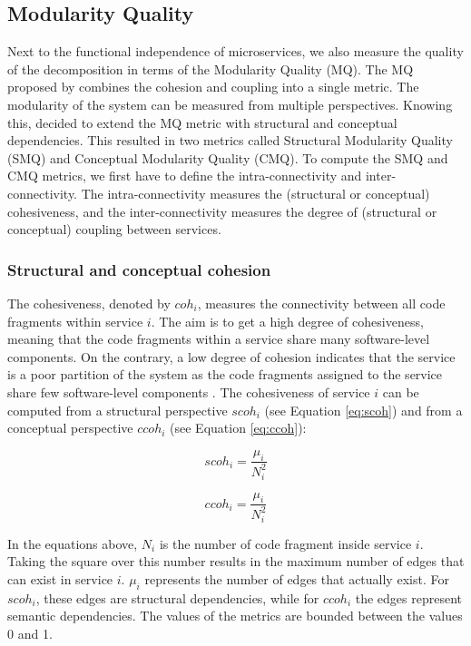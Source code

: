 \subsection{Modularity Quality}\label{ss:step4_mq}
Next to the functional independence of microservices, we also measure the quality of the decomposition in terms of the Modularity Quality (MQ). The MQ proposed by \citeauthor{mancoridis1998using} \cite{mancoridis1998using} combines the cohesion and coupling into a single metric. The modularity of the system can be measured from multiple perspectives. Knowing this, \citeauthor{jin2019service} \cite{jin2019service} decided to extend the MQ metric with structural and conceptual dependencies. This resulted in two metrics called Structural Modularity Quality (SMQ) and Conceptual Modularity Quality (CMQ). To compute the SMQ and CMQ metrics, we first have to define the intra-connectivity and inter-connectivity. The intra-connectivity measures the (structural or conceptual) cohesiveness, and the inter-connectivity measures the degree of (structural or conceptual) coupling between services. 

\subsubsection{Structural and conceptual cohesion}\label{sss:step4_smq_cmq}
The cohesiveness, denoted by $coh_i$, measures the connectivity between all code fragments within service $i$. The aim is to get a high degree of cohesiveness, meaning that the code fragments within a service share many software-level components. On the contrary, a low degree of cohesion indicates that the service is a poor partition of the system as the code fragments assigned to the service share few software-level components \cite{mancoridis1998using}. The cohesiveness of service $i$ can be computed from a structural perspective $scoh_i$ (see Equation \ref{eq:scoh}) and from a conceptual perspective $ccoh_i$ (see Equation \ref{eq:ccoh}):

\begin{equation}\label{eq:scoh}
    scoh_i = \frac{\mu_i}{N^2_i}
\end{equation}

\begin{equation}\label{eq:ccoh}
    ccoh_i = \frac{\mu_i}{N^2_i}
\end{equation}

In the equations above, $N_i$ is the number of code fragment inside service $i$. Taking the square over this number results in the maximum number of edges that can exist in service $i$. $\mu_i$ represents the number of edges that actually exist. For $scoh_i$, these edges are structural dependencies, while for $ccoh_i$ the edges represent semantic dependencies. The values of the metrics are bounded between the values 0 and 1. 

